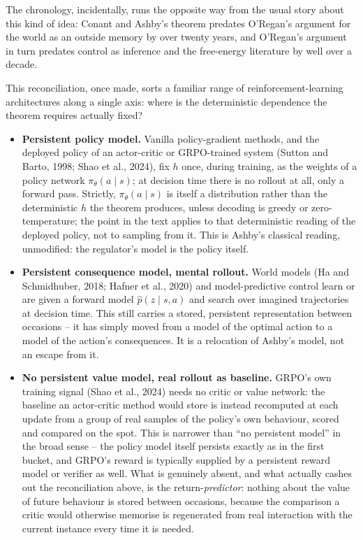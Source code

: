\documentclass[11pt]{article}
\theoremstyle{definition}
\theoremstyle{remark}
\begin{document}
The chronology, incidentally, runs the opposite way from the usual story
about this kind of idea: Conant and Ashby's theorem predates O'Regan's
argument for the world as an outside memory by over twenty years, and
O'Regan's argument in turn predates control as inference and the
free-energy literature by well over a decade.

This reconciliation, once made, sorts a familiar range of
reinforcement-learning architectures along a single axis: where is the
deterministic dependence the theorem requires actually fixed?

\begin{itemize}
\item \textbf{Persistent policy model.} Vanilla policy-gradient methods,
  and the deployed policy of an actor-critic or GRPO-trained system
  (Sutton and Barto, 1998; Shao et al., 2024), fix $h$ once, during
  training, as the weights of a policy network $\pi_\theta(a\mid s)$; at
  decision time there is no rollout at all, only a forward pass. Strictly,
  $\pi_\theta(a\mid s)$ is itself a distribution rather than the
  deterministic $h$ the theorem produces, unless decoding is greedy or
  zero-temperature; the point in the text applies to that deterministic
  reading of the deployed policy, not to sampling from it. This is
  Ashby's classical reading, unmodified: the regulator's model is the
  policy itself.
\item \textbf{Persistent consequence model, mental rollout.} World
  models (Ha and Schmidhuber, 2018; Hafner et al., 2020) and
  model-predictive control learn or are given a forward model
  $\hat p(z\mid s,a)$ and search over imagined trajectories at decision
  time. This still carries a stored, persistent representation between
  occasions -- it has simply moved from a model of the optimal action to
  a model of the action's consequences. It is a relocation of Ashby's
  model, not an escape from it.
\item \textbf{No persistent value model, real rollout as baseline.} GRPO's
  own training signal (Shao et al., 2024) needs no critic or value
  network: the baseline an actor-critic method would store is instead
  recomputed at each update from a group of real samples of the policy's
  own behaviour, scored and compared on the spot. This is narrower than
  ``no persistent model'' in the broad sense -- the policy model itself
  persists exactly as in the first bucket, and GRPO's reward is typically
  supplied by a persistent reward model or verifier as well. What is
  genuinely absent, and what actually cashes out the reconciliation above,
  is the return-\emph{predictor}: nothing about the value of future
  behaviour is stored between occasions, because the comparison a critic
  would otherwise memorise is regenerated from real interaction with the
  current instance every time it is needed.
\end{itemize}
\end{document}
